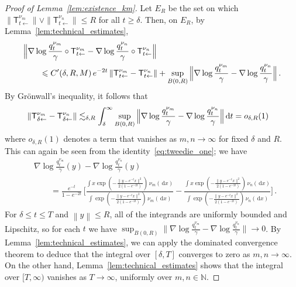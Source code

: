 \documentclass[10pt,a4paper]{amsart}
\newcommand{\N}{\mathbb{N}}
\newcommand*{\dd}{\, \rd}
\renewcommand{\ge}{\geqslant}
\renewcommand{\le}{\leqslant}
\newcommand*{\norm}[1]{\left\|#1\right\|}
\newcommand*{\rd}{\mathrm{d}}
\begin{document}
\begin{proof}[Proof of Lemma~\ref{lem:existence_km}]
    Let $E_R$ be the set on which $\|\mathsf T_{t\gets}^{\nu_m}\| \vee \|\mathsf T_{t\gets}^{\nu_n}\| \le R$ for all $t \ge \delta$.
    Then, on $E_R$, by Lemma~\ref{lem:technical_estimates},
    \begin{align*}
        &\Bigl\lVert \nabla \log \frac{q_t^{\nu_m}}{\gamma} \circ \mathsf T^{\nu_m}_{t\gets} - \nabla \log \frac{q_t^{\nu_n}}{\gamma} \circ \mathsf T^{\nu_n}_{t\gets}\Bigr\rVert \\
        &\qquad \le C'(\delta,R,M)\,e^{-2t}\,\|\mathsf T_{t\gets}^{\nu_m} - \mathsf T_{t\gets}^{\nu_n}\| + \sup_{B(0,R)}{\Bigl\lVert\nabla \log \frac{q_t^{\nu_m}}{\gamma} - \nabla \log \frac{q_t^{\nu_n}}{\gamma} \Bigr\rVert}\,.
    \end{align*}
    By Gr\"{o}nwall's inequality, it follows that
    \begin{align*}
        \|\mathsf T^{\nu_{m}}_{\delta\gets} - \mathsf T^{\nu_{n}}_{\delta\gets}\|
        &\lesssim_{\delta,R} \int_\delta^\infty\sup_{B(0,R)}{\Bigl\lVert\nabla \log \frac{q_t^{\nu_m}}{\gamma} - \nabla \log \frac{q_t^{\nu_n}}{\gamma} \Bigr\rVert}\dd t
        = o_{\delta,R}(1)
    \end{align*}
    where $o_{\delta,R}(1)$ denotes a term that vanishes as $m,n\to\infty$ for fixed $\delta$ and $R$.
    This can again be seen from the identity~\eqref{eq:tweedie_one}; we have
    \begin{align*}
        &\nabla \log \frac{q_t^{\nu_m}}{\gamma}(y) - \nabla \log \frac{q_t^{\nu_n}}{\gamma}(y) \\
        &\qquad = \frac{e^{-t}}{1-e^{-2t}}\,\biggl[\frac{\int x \exp(-\frac{\|y-e^{-t} x\|^2}{2(1-e^{-2t})})\,\nu_m(\!\dd x)}{\int \exp(-\frac{\|y-e^{-t} x\|^2}{2(1-e^{-2t})})\,\nu_m(\!\dd x)} - \frac{\int x \exp(-\frac{\|y-e^{-t} x\|^2}{2(1-e^{-2t})})\,\nu_n(\!\dd x)}{\int \exp(-\frac{\|y-e^{-t} x\|^2}{2(1-e^{-2t})})\,\nu_n(\!\dd x)}\biggr]\,.
    \end{align*}
    For $\delta \le t \le T$ and $\norm y \le R$, all of the integrands are uniformly bounded and Lipschitz, so for each $t$ we have $\sup_{B(0,R)}{\bigl\lVert\nabla \log \frac{q_t^{\nu_m}}{\gamma} - \nabla \log \frac{q_t^{\nu_n}}{\gamma} \bigr\rVert} \to 0$.
    By Lemma~\ref{lem:technical_estimates}, we can apply the dominated convergence theorem to deduce that the integral over $[\delta,T]$ converges to zero as $m,n\to\infty$.
    On the other hand, Lemma~\ref{lem:technical_estimates} shows that the integral over $[T,\infty)$ vanishes as $T\to\infty$, uniformly over $m,n\in\N$.


\end{proof}
\end{document}
